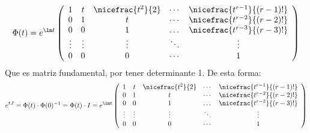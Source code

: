 \begin{equation*}
    \Phi(t) = e^{\lm t} \left(\begin{array}{ccccc}
            1 & t & \nicefrac{t^2}{2} & \cdots & \nicefrac{t^{r-1}}{(r-1)!} \\
            0 & 1 & t & \cdots & \nicefrac{t^{r-2}}{(r-2)!}\\
            0 & 0 & 1 & \dots &  \nicefrac{t^{r-3}}{(r-3)!}\\
            \vdots & \vdots & \vdots & \ddots & \vdots\\
            0 & 0 & 0 & \cdots & 1
    \end{array}\right)
\end{equation*}
Que es matriz fundamental, por tener determinante 1. De esta forma:
\begin{equation*}
    e^{tJ} = \Phi(t)\cdot \Phi(0)^{-1} = \Phi(t)\cdot I = e^{\lm t}\left(\begin{array}{ccccc}
            1 & t & \nicefrac{t^2}{2} & \cdots & \nicefrac{t^{r-1}}{(r-1)!} \\
            0 & 1 & t & \cdots & \nicefrac{t^{r-2}}{(r-2)!}\\
            0 & 0 & 1 & \dots &  \nicefrac{t^{r-3}}{(r-3)!}\\
            \vdots & \vdots & \vdots & \ddots & \vdots\\
            0 & 0 & 0 & \cdots & 1
    \end{array}\right)
\end{equation*}

